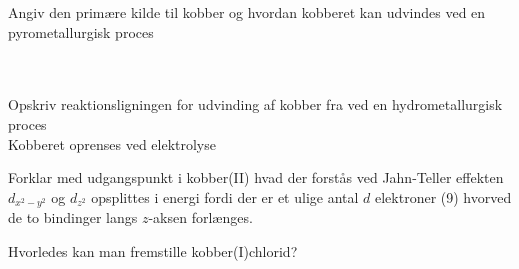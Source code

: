 \begin{flashcard}[Fremstilling]{Angiv den primære kilde til kobber og hvordan kobberet kan udvindes ved en pyrometallurgisk proces}
\\
\\
\\
\end{flashcard}

\begin{flashcard}[Fremstilling]{Opskriv reaktionsligningen for udvinding af kobber fra  ved en hydrometallurgisk proces}
\\
Kobberet oprenses ved elektrolyse
\end{flashcard}

\begin{flashcard}[Egenskab]{Forklar med udgangspunkt i kobber(II) hvad der forstås ved Jahn-Teller effekten}
$d_{x^2-y^2}$ og $d_{z^2}$ opsplittes i energi fordi der er et ulige antal $d$ elektroner (9) hvorved de to bindinger langs $z$-aksen forlænges.
\end{flashcard}

\begin{flashcard}[Fremstilling]{Hvorledes kan man fremstille kobber(I)chlorid?}
\\
\\
\end{flashcard}